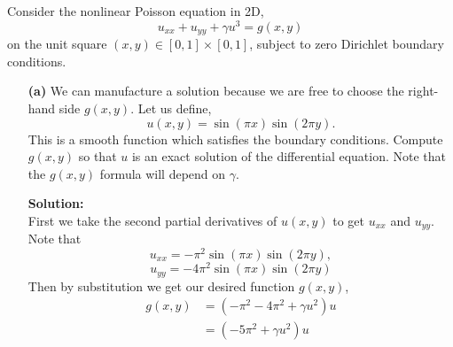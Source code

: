 \documentclass[12pt]{article}
\makeatletter
\theoremstyle{homework}
\newenvironment{exercise}[1]
{\def\@currentlabel{#1}\exercisecore}
{\endexercisecore}
\newcommand{\localhead}[1]{\par\smallskip\noindent\textbf{#1}\nobreak\\}%
\newcommand\solution{\localhead{Solution:}}
\makeatother
\begin{document}
\vspace{.15in}

\begin{exercise}{Problem P38} Consider the nonlinear Poisson equation in 2D, 
  \begin{equation*}
    u_{xx} + u_{yy} + \gamma u^3 = g(x, y)
  \end{equation*}
  on the unit square $(x, y) \in [0, 1] \times [0, 1]$, subject to zero Dirichlet boundary conditions. 

  \begin{enumerate}
    \item[\textbf{(a)}] We can manufacture a solution because we are free to choose the right-hand side $g(x, y)$. Let us define, $$u(x, y) = \sin(\pi x)\sin(2 \pi y).$$ This is a smooth function which satisfies the boundary conditions. Compute $g(x, y)$ so that $u$ is an exact solution of the differential equation. Note that the $g(x, y)$ formula will depend on $\gamma$. 
    \solution First we take the second partial derivatives of $u(x, y)$ to get $u_{xx}$ and $u_{yy}$.
    Note that $$u_{xx} = -\pi ^2\sin \left(\pi x\right)\sin \left(2\pi y\right),$$ $$u_{yy} = -4\pi ^2\sin \left(\pi x\right)\sin \left(2\pi y\right)$$
    Then by substitution we get our desired function $g(x, y)$, 
    \begin{align*}
      g(x, y) &= (-\pi^2 - 4\pi^2 + \gamma u^2)u\\
       &= (- 5\pi^2 + \gamma u^2)u
      \end{align*}
    \vspace*{.15in}


\end{enumerate}
\end{exercise}
\end{document}
